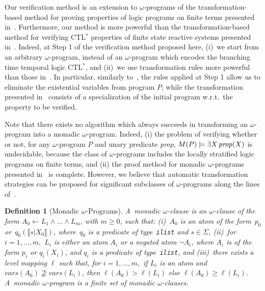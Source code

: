\documentclass[english]{tlp}
\newtheorem{definition}{Definition} \newtheorem{example}{Example}       \newtheorem{remark}{Remark}
\renewcommand{\mathit}{\displaystyle}
\begin{document}
Our verification method is an extension to $\omega$-programs of
the transformation-based method for proving properties of logic programs on
finite terms presented in~\cite{PeP00a}. 
Furthermore, our method is more powerful than the transformation-based
method for verifying CTL$^*$ properties of finite state reactive
systems presented in~\cite{Pe&09b}. Indeed, at Step 1 of the verification
method proposed here,
(i)~we start from an arbitrary $\omega$-program,
instead of an $\omega$-program which encodes the
branching time temporal logic CTL$^*$, and 
(ii)~we use transformation rules more powerful than those in~\cite{Pe&09b}.
In particular, similarly to~\cite{PeP00a}, the rules
applied at Step 1 allow us to
eliminate the existential variables from program $P$, while the
transformation presented in~\cite{Pe&09b} consists of a specialization
of the initial program w.r.t.~the property to be verified.

Note that there exists no algorithm which always succeeds in transforming an
\mbox{$\omega$-program} into a monadic $\omega$-program.
Indeed, (i) the problem of verifying whether or not, for any $\omega$-program
$P$ and unary predicate {\it prop},
$M(P)\models\exists X\, {\it prop}(X)$ is undecidable, 
because the class of \mbox{$\omega$-programs} includes
the locally stratified logic programs on finite terms,
and (ii) the proof method for monadic
$\omega$-programs presented in~\cite{Pe&09b} is complete.
However, we believe that automatic transformation strategies
can be proposed for significant subclasses of \mbox{$\omega$-programs} along the lines 
of~\cite{PrP95a,PeP00a}.

\begin{definition} [Monadic $\omega$-Programs]
\label{def:monadic_omega_programs}\rm A~{\em monadic}
\mbox{$\omega$-clause} is an $\omega$-clause of the form
$A_0\leftarrow L_1\wedge\ldots\wedge L_m$, with $m\!\geq\! 0$, such
that: (i)~$A_0$ is an atom of the form~$p_0$ or~$q_0(\llbracket s|X_0
\rrbracket)$,
where~$q_0$ is a predicate of type~\texttt{ilist} and
$s\!\in\!\Sigma$, (ii)~for $i\!=\!1,\ldots,m,$ $L_i$ is either an atom
$A_i$ or a negated atom $\neg A_i$, where $A_i$ is of the form $p_i$
or $q_i(X_i)$, and $q_i$ is a predicate of type~\texttt{ilist}, and
(iii)~there exists a level mapping $\ell$ such that, for
$i\!=\!1,\ldots,m,$ if $L_i$ is an atom and
$\mathit{vars}(A_0)\!\not\supseteq\! \mathit{vars}(L_i)$, then
$\ell(A_0)\!>\!\ell(L_i)$ else $\ell(A_0)\!\geq\! \ell(L_i)$. A~{\em monadic
$\omega$-program} is a finite set of monadic $\omega$-clauses.
\end{definition}
\end{document}
